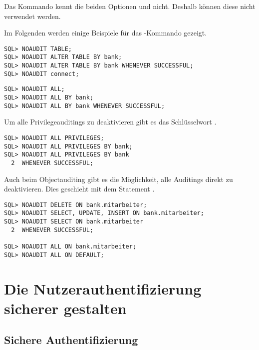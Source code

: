         \begin{merke}
          Das Kommando  kennt die beiden Optionen  und  nicht. Deshalb k\"onnen diese nicht verwendet werden.
        \end{merke}
        Im Folgenden werden einige Beispiele f\"ur das -Kommando gezeigt.
\clearpage
        \begin{lstlisting}[caption={Statement- und Privilegeauditing deaktivieren},label=admin818,language=oracle_sql]
SQL> NOAUDIT TABLE;
SQL> NOAUDIT ALTER TABLE BY bank;
SQL> NOAUDIT ALTER TABLE BY bank WHENEVER SUCCESSFUL;
SQL> NOAUDIT connect;
        \end{lstlisting}
        \begin{lstlisting}[caption={Alle AUDIT ALL-Statements
        deaktivieren},label=admin819,language=oracle_sql]
SQL> NOAUDIT ALL;
SQL> NOAUDIT ALL BY bank;
SQL> NOAUDIT ALL BY bank WHENEVER SUCCESSFUL;
        \end{lstlisting}
        \begin{merke}
          Um alle Privilegeauditings zu deaktivieren gibt es das Schl\"usselwort .
        \end{merke}
        \begin{lstlisting}[caption={Alle Privilegeauditings deaktivieren},label=admin820,language=oracle_sql]
SQL> NOAUDIT ALL PRIVILEGES;
SQL> NOAUDIT ALL PRIVILEGES BY bank;
SQL> NOAUDIT ALL PRIVILEGES BY bank
  2  WHENEVER SUCCESSFUL;
        \end{lstlisting}
        Auch beim Objectauditing gibt es die M\"oglichkeit, alle Auditings direkt zu deaktivieren. Dies geschieht mit dem Statement .
        \begin{lstlisting}[caption={Objectauditing deaktivieren},label=admin821,language=oracle_sql]
SQL> NOAUDIT DELETE ON bank.mitarbeiter;
SQL> NOAUDIT SELECT, UPDATE, INSERT ON bank.mitarbeiter;
SQL> NOAUDIT SELECT ON bank.mitarbeiter
  2  WHENEVER SUCCESSFUL;

SQL> NOAUDIT ALL ON bank.mitarbeiter;
SQL> NOAUDIT ALL ON DEFAULT;
        \end{lstlisting}
    \section{Die Nutzerauthentifizierung sicherer gestalten}
      \subsection{Sichere Authentifizierung}
